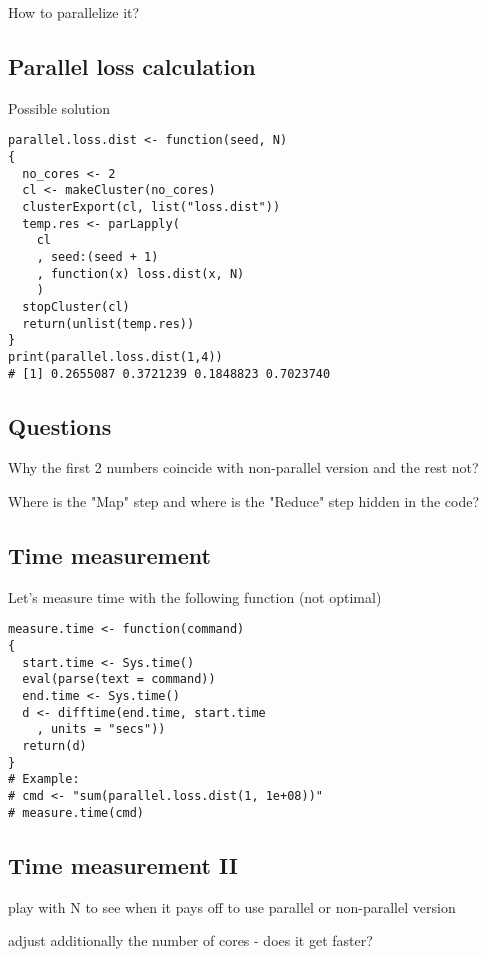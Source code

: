 \documentclass[bigger]{beamer}
\begin{document}
\begin{frame}[label=sec-3-13-2]{How to parallelize it?}
\end{frame}
\subsection{Parallel loss calculation}
\label{sec-3-14}
\begin{frame}[fragile,label=sec-3-14-1]{Possible solution}
 \begin{verbatim}
parallel.loss.dist <- function(seed, N)
{
  no_cores <- 2
  cl <- makeCluster(no_cores)
  clusterExport(cl, list("loss.dist"))
  temp.res <- parLapply(
	cl
	, seed:(seed + 1)
	, function(x) loss.dist(x, N)
	)
  stopCluster(cl)
  return(unlist(temp.res))
}
print(parallel.loss.dist(1,4))
# [1] 0.2655087 0.3721239 0.1848823 0.7023740
\end{verbatim}
\end{frame}

\subsection{Questions}
\label{sec-3-15}
\begin{frame}[label=sec-3-15-1]{Why the first 2 numbers coincide with non-parallel version and the rest not?}
\end{frame}
\begin{frame}[label=sec-3-15-2]{Where is the "Map" step and where is the "Reduce" step hidden in the code?}
\end{frame}
\subsection{Time measurement}
\label{sec-3-16}
\begin{frame}[fragile,label=sec-3-16-1]{Let's measure time with the following function (not optimal)}
 \begin{verbatim}
measure.time <- function(command)
{
  start.time <- Sys.time()
  eval(parse(text = command))
  end.time <- Sys.time()
  d <- difftime(end.time, start.time
	, units = "secs"))
  return(d)
}
# Example:
# cmd <- "sum(parallel.loss.dist(1, 1e+08))"
# measure.time(cmd)
\end{verbatim}
\end{frame}

\subsection{Time measurement II}
\label{sec-3-17}
\begin{frame}[label=sec-3-17-1]{play with N to see when it pays off to use parallel or non-parallel version}
\end{frame}
\begin{frame}[label=sec-3-17-2]{adjust additionally the number of cores - does it get faster?}
\end{frame}
\end{document}
